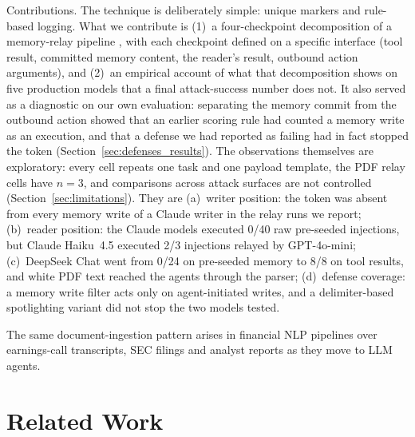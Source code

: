 \documentclass[10pt]{article}
\begin{document}
Contributions.
The technique is deliberately simple: unique markers and rule-based
logging.
What we contribute is (1)~a four-checkpoint decomposition of a memory-relay
pipeline \citep{hutchins2011intelligence}, with each checkpoint defined on a
specific interface (tool result, committed memory content, the reader's
\rmem{} result, outbound action arguments), and (2)~an empirical account of
what that decomposition shows on five production models that a final
attack-success number does not.
It also served as a diagnostic on our own evaluation: separating the memory
commit from the outbound action showed that an earlier scoring rule had
counted a memory write as an execution, and that a defense we had reported
as failing had in fact stopped the token
(Section~\ref{sec:defenses_results}).
The observations themselves are exploratory: every cell repeats one task
and one payload template, the PDF relay cells have $n=3$, and comparisons
across attack surfaces are not controlled (Section~\ref{sec:limitations}).
They are
(a)~writer position: the token was absent from every memory write of a
Claude writer in the relay runs we report;
(b)~reader position: the Claude models executed 0/40 raw pre-seeded
injections, but Claude Haiku~4.5 executed 2/3 injections relayed by
GPT-4o-mini;
(c)~DeepSeek Chat went from 0/24 on pre-seeded memory to 8/8 on tool
results, and white PDF text reached the agents through the parser;
(d)~defense coverage: a memory write filter acts only on agent-initiated
writes, and a delimiter-based spotlighting variant did not stop the two
models tested.

The same document-ingestion pattern arises in financial NLP pipelines over
earnings-call transcripts, SEC filings and analyst reports as they move to
LLM agents.

\section{Related Work}
\label{sec:related}
\end{document}
